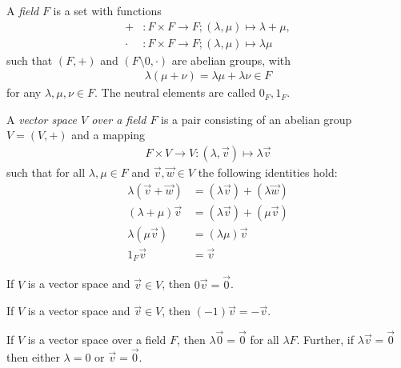\documentclass{article}
\begin{document}
\begin{definition}
    A \emph{field} $F$ is a set with functions
    \begin{align*}
        +     & : F\times F \to F ; (\lambda,\mu) \mapsto \lambda + \mu, \\
        \cdot & : F\times F \to F ; (\lambda,\mu) \mapsto \lambda \mu
    \end{align*}
    such that $(F,+)$ and $(F\setminus{0},\cdot)$ are abelian groups, with
    \begin{align*}
        \lambda(\mu + \nu) = \lambda \mu + \lambda \nu \in F
    \end{align*}
    for any $\lambda,\mu,\nu\in F$. The neutral elements are called $0_F,1_F$.
\end{definition}

\begin{definition}
    A \emph{vector space $V$ over a field $F$} is a pair consisting of an abelian
    group $V=(V,+)$ and a mapping
    \begin{align*}
        F\times V\to V:(\lambda,\vec v) \mapsto \lambda \vec v
    \end{align*}
    such that for all $\lambda,\mu\in F$ and $\vec v,\vec w\in V$ the following
    identities hold:
    \begin{align*}
        \lambda(\vec v + \vec w) & = (\lambda\vec v) + (\lambda \vec w) \\
        (\lambda +\mu)\vec v     & = (\lambda\vec v) + (\mu \vec v)     \\
        \lambda(\mu\vec v)       & = (\lambda\mu)\vec v                 \\
        1_F \vec v               & = \vec v
    \end{align*}
\end{definition}

\begin{lemma}[Notes 1.2.2]
    If $V$ is a vector space and $\vec v\in V$, then $0\vec v =\vec 0$.
\end{lemma}

\begin{lemma}[Notes 1.2.3]
    If $V$ is a vector space and $\vec v\in V$, then $(-1)\vec v = -\vec v$.
\end{lemma}

\begin{lemma}[Notes 1.2.4]
    If $V$ is a vector space over a field $F$, then $\lambda\vec 0=\vec 0$
    for all $\lambda F$. Further, if $\lambda\vec v=\vec 0$ then either
    $\lambda =0$ or $\vec v =\vec 0$.
\end{lemma}
\end{document}
